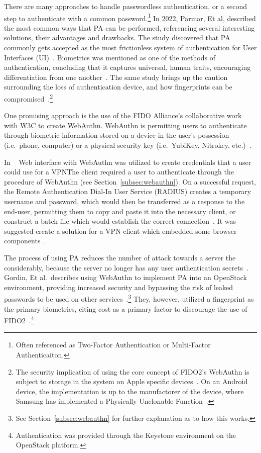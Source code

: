 There are many approaches to handle passwordless authentication, or a second
step to authenticate with a common password.\footnote{
  Often referenced as Two-Factor Authentication or Multi-Factor Authenticaiton.
}
In 2022, Parmar, Et al\cite{parmar2022}, described the most common
ways that PA can be performed, referencing several interesting solutions,
their advantages and drawbacks.
The study discovered that PA commonly gets accepted as the most frictionless
system of authentication for User Interfaces (UI)~\cite{parmar2022}.
Biometrics was mentioned as one of the methods of authentication, concluding
that it captures universal, human traits, encouraging differentiation
from one another~\cite{parmar2022}.
The same study brings up the caution surrounding the loss of authentication
device, and how fingerprints can be compromised~\cite{parmar2022}.\footnote{
  The security implication of using the core concept of FIDO2's WebAuthn is
  subject to storage in the system on Apple specific devices~\cite{appleSecureEnclave}.
  On an Android device, the implementation is up to the manufactorer of the
  device, where Samsung has implemented a Physically Unclonable
  Function~\cite{lee2021samsung}.
}

One promising approach is the use of the FIDO Alliance's collaborative work with
W3C to create WebAuthn.
WebAuthn is permitting users to authenticate through biometric information
stored on a device in the user's possession (i.e.\ phone, computer) or a
physical security key (i.e.\ YubiKey, Nitrokey, etc.)~\cite{webauthn_level_2}.

In ~\cite{huseynov2022passwordless} Web interface with WebAuthn was utilized to
create credentials that a user could use for a VPN\.
The client required a user to authenticate through the procedure of WebAuthn
(see Section~\ref{subsec:webauthn}).
On a successful request, the Remote Authentication Dial-In User Service (RADIUS)
creates a temporary username and password, which would then be transferred
as a response to the end-user, permitting them to copy and paste it into the
necessary client, or construct a batch file which would establish the correct
connection~\cite{huseynov2022passwordless}.
It was suggested create a solution for a VPN client which embedded some browser
components~\cite{huseynov2022passwordless}.

The process of using PA reduces the number of attack towards a server the
considerably, because the server no longer has any user authentication
secrets~\cite{gordin2021moving}.
Gordin, Et al.\ describes using WebAuthn to implement PA into an OpenStack
environment, providing increased security and bypassing the risk of leaked
passwords to be used on other services~\cite{gordin2021moving}.\footnote{
  See Section~\ref{subsec:webauthn} for further explanation as to how this
  works.
}
They, however, utilized a fingerprint as the primary biometrics, citing cost as
a primary factor to discourage the use of FIDO2~\cite{gordin2021moving}.\footnote{
  Authentication was provided through the Keystone environment on the OpenStack
  platform.
}

